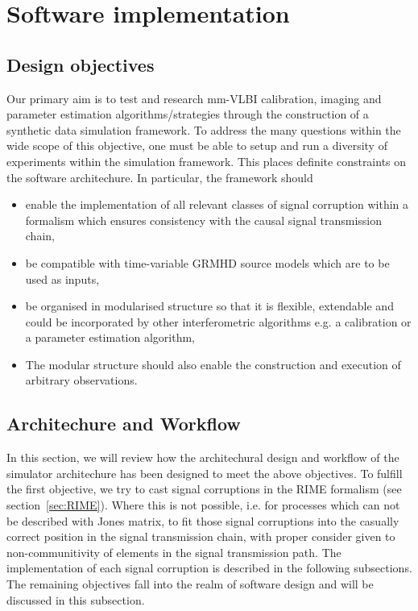 \chapter{Software implementation}\label{chap:imp}

\section{Design objectives}\label{sec:des_obj}
Our primary aim is to test and research mm-VLBI calibration, imaging and parameter estimation algorithms/strategies through the construction of a synthetic data simulation framework. To address the many questions within the wide scope of this objective, one must be able to setup and run a diversity of experiments within the simulation framework. This places definite constraints on the software architechure. In particular, the framework should 


\begin{itemize}
 \item enable the implementation of all relevant classes of signal corruption within a formalism which ensures consistency with the causal signal transmission chain,
 \item be compatible with time-variable GRMHD source models which are to be used as inputs,
 \item be organised in modularised structure so that it is flexible, extendable and could be incorporated by other interferometric algorithms e.g. a calibration or a parameter estimation algorithm,
 \item The modular structure should also enable the construction and execution of arbitrary observations.
\end{itemize}

\section{Architechure and Workflow}\label{sec:arch}
In this section, we will review how the architechural design and workflow of the simulator architechure has been designed to meet the above objectives. To fulfill the first objective, we try to cast signal corruptions in the RIME formalism (see section~\ref{sec:RIME}). Where this is not possible, i.e. for processes which can not be described with Jones matrix, to fit those signal corruptions into the casually correct position in the signal transmission chain, with proper consider given to non-communitivity of elements in the signal transmission path. The implementation of each signal corruption is described in the following subsections. The remaining objectives fall into the realm of software design and will be discussed in this subsection. 


